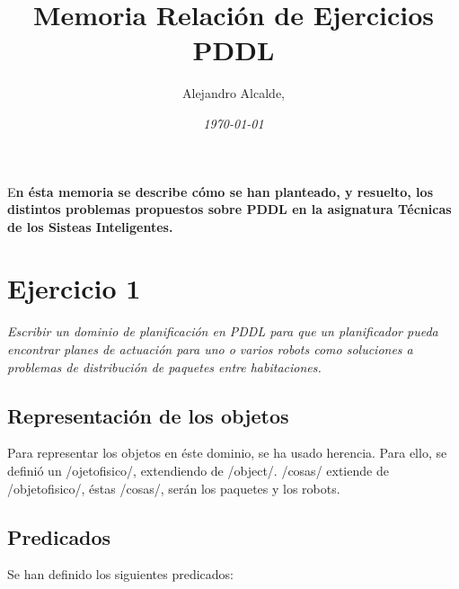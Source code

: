 \documentclass[	DIV=calc,%
							paper=a4,%
							fontsize=11pt]{scrartcl}	 					%
\title{Memoria Relación de Ejercicios PDDL}					%
\author{Alejandro Alcalde, }											%
\date{\textit{\today}}																				%
\newcommand{\initial}[1]{%
     \lettrine[lines=3,lhang=0.3,nindent=0em]{
     				\color{DarkGoldenrod}
     				{\textsf{#1}}}{}}
\begin{document}
\maketitle
\thispagestyle{fancy} 			%
\initial{E}\textbf{n ésta memoria se describe cómo se han planteado, y resuelto, los distintos problemas propuestos sobre PDDL en la asignatura Técnicas de los Sisteas Inteligentes.}

\section{Ejercicio 1}

\textit{Escribir un dominio de planificación en PDDL para que un planificador pueda encontrar planes de actuación para uno o varios robots como
soluciones a problemas de distribución de paquetes entre habitaciones.}

\subsection{Representación de los objetos}

Para representar los objetos en éste dominio, se ha usado herencia. Para ello, se definió un \newlispinline/ojetofisico/, extendiendo de \newlispinline/object/. \newlispinline/cosas/ extiende de \newlispinline/objetofisico/, éstas \newlispinline/cosas/, serán los paquetes y los robots.

\subsection{Predicados}

Se han definido los siguientes predicados:
\end{document}
